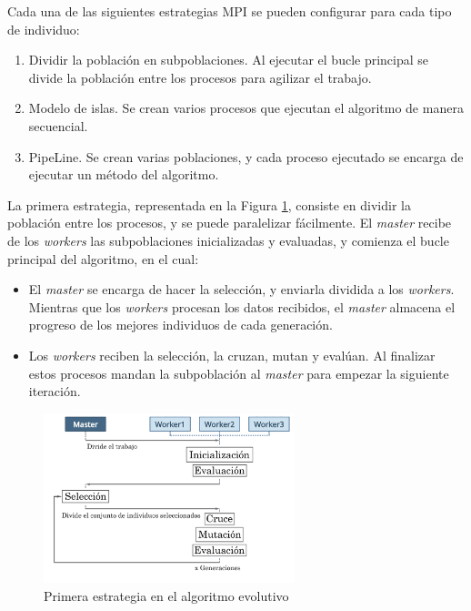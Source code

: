 	
	Cada una de las siguientes estrategias MPI se pueden configurar para cada tipo de individuo:

	\begin{enumerate}
		\item Dividir la población en subpoblaciones. Al ejecutar el bucle principal se divide la población entre los procesos para agilizar el trabajo.
		\item Modelo de islas. Se crean varios procesos que ejecutan el algoritmo de manera secuencial.
		\item PipeLine. Se crean varias poblaciones, y cada proceso ejecutado se encarga de ejecutar un método del algoritmo.
	\end{enumerate}
	
	La primera estrategia, representada en la Figura \ref{fig:pev_mpi1}, consiste en dividir la población entre los procesos, y se puede paralelizar fácilmente. El \textit{master} recibe de los \textit{workers} las subpoblaciones inicializadas y evaluadas, y comienza el bucle principal del algoritmo, en el cual:
	\begin{itemize}
		\item El \textit{master} se encarga de hacer la selección, y enviarla dividida a los \textit{workers}. Mientras que los \textit{workers} procesan los datos recibidos, el \textit{master} almacena el progreso de los mejores individuos de cada generación.
		\item Los \textit{workers} reciben la selección, la cruzan, mutan y evalúan. Al finalizar estos procesos mandan la subpoblación al \textit{master} para empezar la siguiente iteración.
	\end{itemize}
	
	\begin{figure}[!h]
		\centering
		\includegraphics[width=0.65\textwidth]{images/chapter_3/pev_mpi1}
		\caption{Primera estrategia en el algoritmo evolutivo}
		\label{fig:pev_mpi1}
	\end{figure}
	

